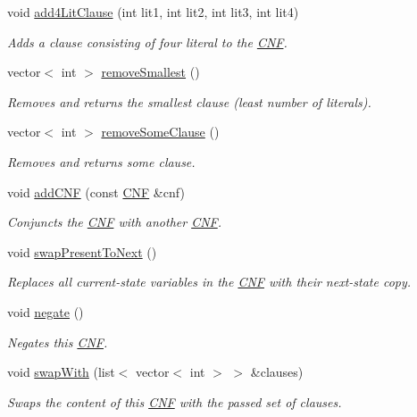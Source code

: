 \begin{DoxyCompactItemize}
void \hyperlink{classCNF_adc908d03185c0baad55c5b240ed667b3}{add4\-Lit\-Clause} (int lit1, int lit2, int lit3, int lit4)
\begin{DoxyCompactList}\small\item\em Adds a clause consisting of four literal to the \hyperlink{classCNF}{C\-N\-F}. \end{DoxyCompactList}\item 
vector$<$ int $>$ \hyperlink{classCNF_ad2ccf3122438927b7d5989c34651bd7e}{remove\-Smallest} ()
\begin{DoxyCompactList}\small\item\em Removes and returns the smallest clause (least number of literals). \end{DoxyCompactList}\item 
vector$<$ int $>$ \hyperlink{classCNF_ac7fef61f8d052bfca0f5cd8f80ca8e1d}{remove\-Some\-Clause} ()
\begin{DoxyCompactList}\small\item\em Removes and returns some clause. \end{DoxyCompactList}\item 
void \hyperlink{classCNF_a037291a95be5b4ec0c14755fd0e18826}{add\-C\-N\-F} (const \hyperlink{classCNF}{C\-N\-F} \&cnf)
\begin{DoxyCompactList}\small\item\em Conjuncts the \hyperlink{classCNF}{C\-N\-F} with another \hyperlink{classCNF}{C\-N\-F}. \end{DoxyCompactList}\item 
void \hyperlink{classCNF_aff6cbbe38a345089b278061f9d0195be}{swap\-Present\-To\-Next} ()
\begin{DoxyCompactList}\small\item\em Replaces all current-\/state variables in the \hyperlink{classCNF}{C\-N\-F} with their next-\/state copy. \end{DoxyCompactList}\item 
void \hyperlink{classCNF_a1d4371fd3b970bde2e8542ab5ad0f881}{negate} ()
\begin{DoxyCompactList}\small\item\em Negates this \hyperlink{classCNF}{C\-N\-F}. \end{DoxyCompactList}\item 
void \hyperlink{classCNF_a39c340549f7acdc1393a5572f3e007cf}{swap\-With} (list$<$ vector$<$ int $>$ $>$ \&clauses)
\begin{DoxyCompactList}\small\item\em Swaps the content of this \hyperlink{classCNF}{C\-N\-F} with the passed set of clauses. \end{DoxyCompactList}\item 

\end{DoxyCompactItemize}
